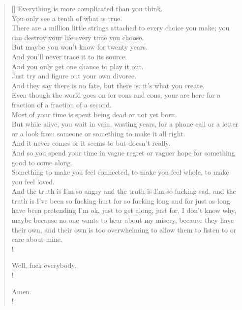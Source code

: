 \documentclass[../butidigress.tex]{subfiles}
\begin{document}
\newpage

\setlength{\versewidth}{65ex}
\begin{verse}[\versewidth]
Everything is more complicated than you think. \\
You only see a tenth of what is true. \\
There are a million little strings attached to every choice you make; you can destroy your life every time you choose. \\
But maybe you won't know for twenty years. \\
And you'll never trace it to its source. \\
And you only get one chance to play it out. \\
Just try and figure out your own divorce. \\
And they say there is no fate, but there is: it's what you create. \\
Even though the world goes on for eons and eons, your are here for a fraction of a fraction of a second. \\
Most of your time is spent being dead or not yet born. \\
But while alive, you wait in vain, wasting years, for a phone call or a letter or a look from someone or something to make it all right. \\
And it never comes or it seems to but doesn't really. \\
And so you spend your time in vague regret or vaguer hope for something good to come along. \\
Something to make you feel connected, to make you feel whole, to make you feel loved. \\
And the truth is I'm so angry and the truth is I'm so fucking sad, and the truth is I've been so fucking hurt for so fucking long and for just as long have been pretending I'm ok, just to get along, just for, I don't know why, maybe because no one wants to hear about my misery, because they have their own, and their own is too overwhelming to allow them to listen to or care about mine. \\!

Well, fuck everybody. \\!

Amen.\\!
\end{verse}

\newpage
\end{document}
